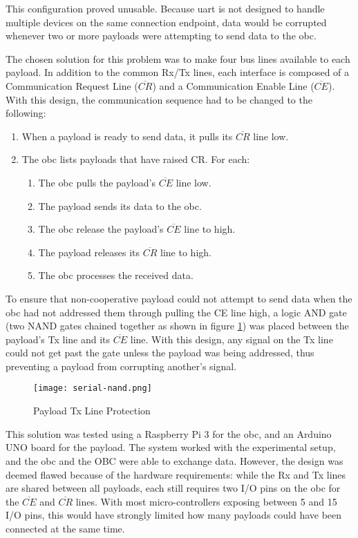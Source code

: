 This configuration proved unusable. Because \acrshort{uart} is not designed
to handle multiple devices on the same connection endpoint, data would be
corrupted whenever two or more payloads were attempting to send data to the
\acrshort{obc}.

The chosen solution for this problem was to make four bus lines available to
each payload. In addition to the common Rx/Tx lines, each interface is composed
of a Communication Request Line ($\overline{CR}$) and a Communication Enable
Line ($\overline{CE}$). With this design, the communication sequence had to
be changed to the following:

\begin{enumerate}
\item When a payload is ready to send data, it pulls its $\overline{CR}$ line
low.
\item The \acrshort{obc} lists payloads that have raised CR. For each:
\begin{enumerate}
    \item The \acrshort{obc} pulls the payload's $\overline{CE}$ line low.
    \item The payload sends its data to the \acrshort{obc}.
    \item The \acrshort{obc} release the payload's $\overline{CE}$ line to high.
    \item The payload releases its $\overline{CR}$ line to high.
    \item The \acrshort{obc} processes the received data.
\end{enumerate}
\end{enumerate}

To ensure that non-cooperative payload could not attempt to send data when the
\acrshort{obc} had not addressed them through pulling the CE line high, a logic
AND gate (two NAND gates chained together as shown in figure \ref{fig:uart-nor})
was placed between the payload's Tx line and its $\overline{CE}$ line. With
this design, any signal on the Tx line could not get past the gate unless the
payload was being addressed, thus preventing a payload from corrupting
another's signal.

\begin{figure}[H]
\texttt{[image: serial-nand.png]}
\centering
\caption{Payload Tx Line Protection}
\label{fig:uart-nor}
\end{figure}

This solution was tested using a Raspberry Pi 3 for the \acrlong{obc}, and an
Arduino UNO board for the payload. The system worked with the experimental
setup, and the \acrlong{obc} and the OBC were able to exchange data. However,
the design was deemed flawed because of the hardware requirements: while the Rx
and Tx lines are shared between all payloads, each still requires two I/O pins
on the \acrshort{obc} for the $\overline{CE}$ and $\overline{CR}$ lines. With
most micro-controllers exposing between 5 and 15 I/O pins, this would have
strongly limited how many payloads could have been connected at the same time.

